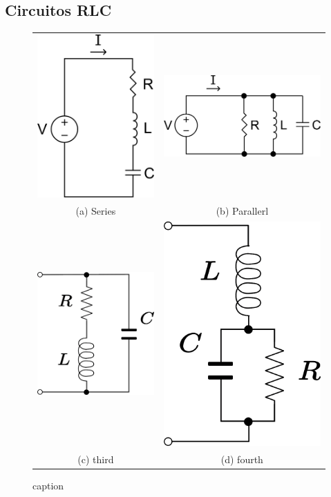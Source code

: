 \documentclass[12pt,twoside]{extarticle}
\begin{document}
\subsection{Circuitos RLC}
\noindent 
\begin{figure}
\begin{tabular}{cc}
  \includegraphics[height=0.34\textwidth]{figures/RLC_series.png} &   \includegraphics[height=0.30\textwidth]{figures/RLC_parallel.png} \\
(a) Series & (b) Parallerl \\[6pt]
  \centering \includegraphics[height=0.35\textwidth]{figures/RL_series_C_parallel.png} &   \includegraphics[height=0.35\textwidth]{figures/L_series_RC_parallel.png} \\
(c) third & (d) fourth \\[6pt]
\end{tabular}
\caption{caption}
\end{figure}
\end{document}

